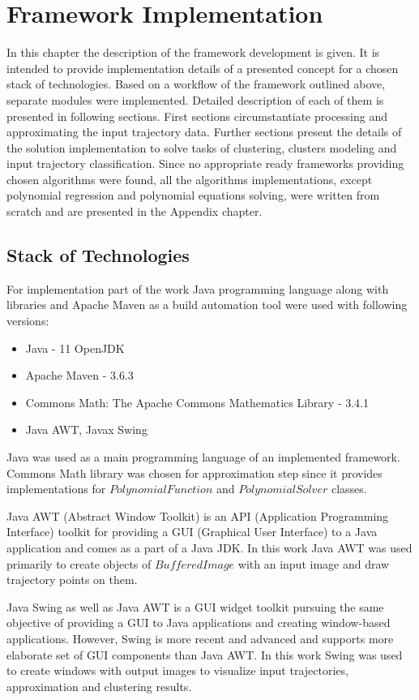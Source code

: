 \chapter{Framework Implementation}

In this chapter the description of the framework development is given. It is intended to provide implementation details of a presented concept for a chosen stack of technologies. Based on a workflow of the framework outlined above, separate modules were implemented. Detailed description of each of them is presented in following sections. First sections circumstantiate processing and approximating the input trajectory data. Further sections present the details of the solution implementation to solve tasks of clustering, clusters modeling and input trajectory classification. Since no appropriate ready frameworks providing chosen algorithms were found, all the algorithms implementations, except polynomial regression and polynomial equations solving, were written from scratch and are presented in the Appendix chapter.

\section{Stack of Technologies}

For implementation part of the work Java programming language along with libraries and Apache Maven as a build automation tool were used with following versions:
\begin{itemize}
	\item Java - 11 OpenJDK
	\item Apache Maven - 3.6.3
	\item Commons Math: The Apache Commons Mathematics Library - 3.4.1
	\item Java AWT, Javax Swing 
\end{itemize}

Java was used as a main programming language of an implemented framework. Commons Math library was chosen for approximation step since it provides implementations for $PolynomialFunction$ and $PolynomialSolver$ classes. 

Java AWT (Abstract Window Toolkit) is an API (Application Programming Interface) toolkit for providing a GUI (Graphical User Interface) to a Java application and comes as a part of a Java JDK. In this work Java AWT was used primarily to create objects of $BufferedImage$ with an input image and draw trajectory points on them.

Java Swing as well as Java AWT is a GUI widget toolkit pursuing the same objective of providing a GUI to Java applications and creating window-based applications. However, Swing is more recent and advanced and supports more elaborate set of GUI components than Java AWT. In this work Swing was used to create windows with output images to visualize input trajectories, approximation and clustering results.

